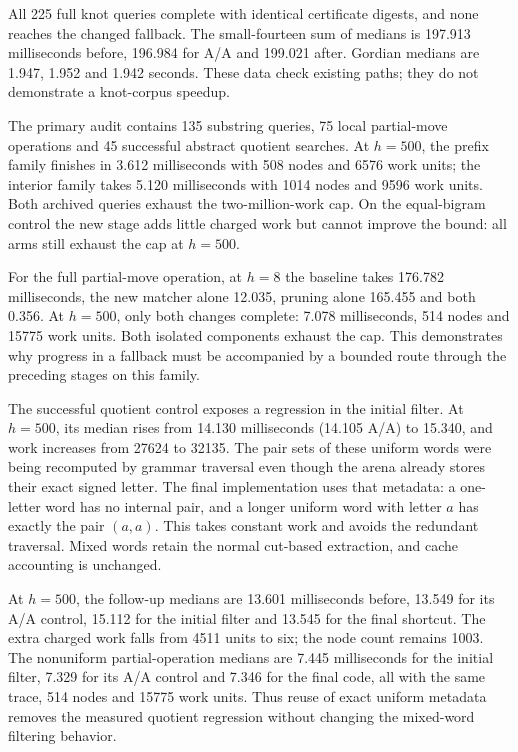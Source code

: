 

All 225 full knot queries complete with identical certificate digests, and
none reaches the changed fallback. The small-fourteen sum of medians is
197.913 milliseconds before, 196.984 for A/A and 199.021 after. Gordian
medians are 1.947, 1.952 and 1.942 seconds. These data check existing paths;
they do not demonstrate a knot-corpus speedup.



The primary audit contains 135 substring queries, 75 local partial-move
operations and 45 successful abstract quotient searches. At $h=500$, the
prefix family finishes in 3.612 milliseconds with 508 nodes and 6576 work
units; the interior family takes 5.120 milliseconds with 1014 nodes and
9596 work units. Both archived queries exhaust the two-million-work cap.
On the equal-bigram control the new stage adds little charged work but
cannot improve the bound: all arms still exhaust the cap at $h=500$.

For the full partial-move operation, at $h=8$ the baseline takes 176.782
milliseconds, the new matcher alone 12.035, pruning alone 165.455 and
both 0.356. At $h=500$, only both changes complete: 7.078 milliseconds,
514 nodes and 15775 work units. Both isolated components exhaust the cap.
This demonstrates why progress in a fallback must be accompanied by a
bounded route through the preceding stages on this family.

The successful quotient control exposes a regression in the initial
filter. At $h=500$, its median rises from 14.130 milliseconds (14.105 A/A)
to 15.340, and work increases from 27624 to 32135. The pair sets of these
uniform words were being recomputed by grammar traversal even though the
arena already stores their exact signed letter. The final implementation
uses that metadata: a one-letter word has no internal pair, and a longer
uniform word with letter $a$ has exactly the pair $(a,a)$. This takes
constant work and avoids the redundant traversal. Mixed words retain the
normal cut-based extraction, and cache accounting is unchanged.



At $h=500$, the follow-up medians are 13.601 milliseconds before, 13.549
for its A/A control, 15.112 for the initial filter and 13.545 for the final
shortcut. The extra charged work falls from 4511 units to six; the node
count remains 1003. The nonuniform partial-operation medians are 7.445
milliseconds for the initial filter, 7.329 for its A/A control and 7.346
for the final code, all with the same trace, 514 nodes and 15775 work units.
Thus reuse of exact uniform metadata removes the measured quotient
regression without changing the mixed-word filtering behavior.

